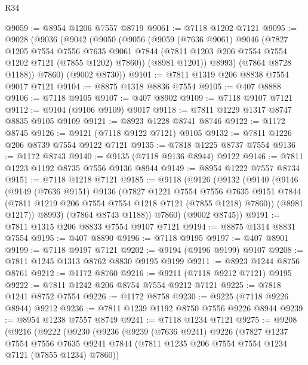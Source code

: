 \begin{lexlean}{R34}
\begin{coremodule}
@9059 := @8954 @1206 @7557 @8719
@9061 := @7118 @1202 @7121
@9095 := @9028
    (@9036
      (@9042
        (@9050
          (@9056
            (@9059
              (@7636 @9061)
              @9046
              (@7827
                @1205
                @7554
                @7556
                @7635
                @9061
                @7844
                (@7811 @1203 @206 @7554 @7554 @1202 @7121 (@7855 @1202) @7860))
              (@8981 @1201))
            @8993)
          (@7864 @8728 @1188))
        @7860)
      (@9002 @8730))
@9101 := @7811 @1319 @206 @8838 @7554 @9017 @7121
@9104 := @8875 @1318 @8836 @7554
@9105 := @407 @8888
@9106 := @7118 @9105
@9107 := @407 @8902
@9109 := @7118 @9107 @7121
@9112 := @9104 (@9106 @9109) @9017
@9118 := @7811 @1229 @1317 @8747 @8835 @9105 @9109
@9121 := @8923 @1228 @8741 @8746
@9122 := @1172 @8745
@9126 := @9121 (@7118 @9122 @7121) @9105
@9132 := @7811 @1226 @206 @8739 @7554 @9122 @7121
@9135 := @7818 @1225 @8737 @7554
@9136 := @1172 @8743
@9140 := @9135 (@7118 @9136 @8944) @9122
@9146 := @7811 @1223 @1192 @8735 @7556 @9136 @8944
@9149 := @8954 @1222 @7557 @8734
@9151 := @7118 @1218 @7121
@9185 := @9118
    (@9126
      (@9132
        (@9140
          (@9146
            (@9149
              (@7636 @9151)
              @9136
              (@7827
                @1221
                @7554
                @7556
                @7635
                @9151
                @7844
                (@7811 @1219 @206 @7554 @7554 @1218 @7121 (@7855 @1218) @7860))
              (@8981 @1217))
            @8993)
          (@7864 @8743 @1188))
        @7860)
      (@9002 @8745))
@9191 := @7811 @1315 @206 @8833 @7554 @9107 @7121
@9194 := @8875 @1314 @8831 @7554
@9195 := @407 @8890
@9196 := @7118 @9195
@9197 := @407 @8901
@9199 := @7118 @9197 @7121
@9202 := @9194 (@9196 @9199) @9107
@9208 := @7811 @1245 @1313 @8762 @8830 @9195 @9199
@9211 := @8923 @1244 @8756 @8761
@9212 := @1172 @8760
@9216 := @9211 (@7118 @9212 @7121) @9195
@9222 := @7811 @1242 @206 @8754 @7554 @9212 @7121
@9225 := @7818 @1241 @8752 @7554
@9226 := @1172 @8758
@9230 := @9225 (@7118 @9226 @8944) @9212
@9236 := @7811 @1239 @1192 @8750 @7556 @9226 @8944
@9239 := @8954 @1238 @7557 @8749
@9241 := @7118 @1234 @7121
@9275 := @9208
    (@9216
      (@9222
        (@9230
          (@9236
            (@9239
              (@7636 @9241)
              @9226
              (@7827
                @1237
                @7554
                @7556
                @7635
                @9241
                @7844
                (@7811 @1235 @206 @7554 @7554 @1234 @7121 (@7855 @1234) @7860))

\end{coremodule}
\end{lexlean}

